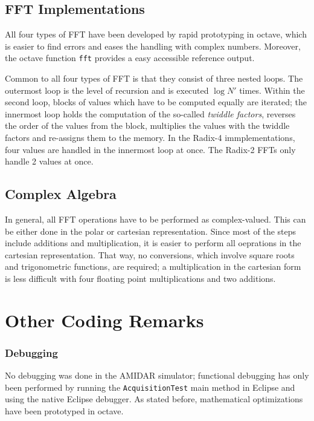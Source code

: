 \subsection{FFT Implementations}
\label{subsec:fftImplementations}

All four types of FFT have been developed by rapid prototyping in octave, which is easier to find errors and eases the handling with complex numbers. Moreover, the octave function \texttt{fft} provides a easy accessible reference output. 

Common to all four types of FFT is that they consist of three nested loops. The outermost loop is the level of recursion and is executed $\log{}N'$ times. Within the second loop, blocks of values which have to be computed equally are iterated; the innermost loop holds the computation of the so-called \emph{twiddle factors}, reverses the order of the values from the block, multiplies the values with the twiddle factors and re-assigns them to the memory. In the Radix-4 immplementations, four values are handled in the innermost loop at once. The Radix-2 FFTs only handle 2 values at once.

\subsection{Complex Algebra}
\label{subsec:ComplexAlgebra}

In general, all FFT operations have to be performed as complex-valued. This can be either done in the polar or cartesian representation. Since most of the steps include additions and multiplication, it is easier to perform all oeprations in the cartesian representation. That way, no conversions, which involve square roots and trigonometric functions, are required; a multiplication in the cartesian form is less difficult with four floating point multiplications and two additions.

\section{Other Coding Remarks}
\label{sec:codeOther}

\subsubsection{Debugging}
\label{subsubsec:debugging}

No debugging was done in the AMIDAR simulator; functional debugging has only been performed by running the \texttt{AcquisitionTest} main method in Eclipse and using the native Eclipse debugger. As stated before, mathematical optimizations have been prototyped in octave.

